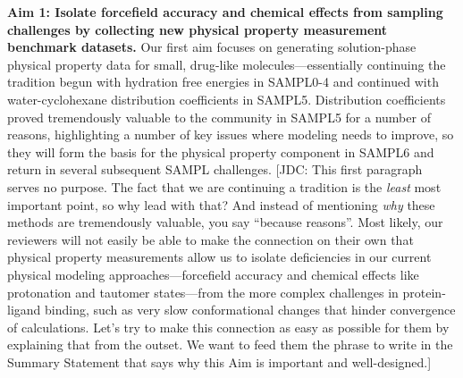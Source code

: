 \documentclass[11pt]{article}
\begin{document}
{\bf Aim 1: Isolate forcefield accuracy and chemical effects from sampling challenges by collecting new physical property measurement benchmark datasets.}
Our first aim focuses on generating solution-phase physical property data for small, drug-like molecules---essentially continuing the tradition begun with hydration free energies in SAMPL0-4 and continued with water-cyclohexane distribution coefficients in SAMPL5. 
Distribution coefficients proved tremendously valuable to the community in SAMPL5 for a number of reasons, highlighting a number of key issues where modeling needs to improve, so they will form the basis for the physical property component in SAMPL6 and return in several subsequent SAMPL challenges.
{\color{red}[JDC: This first paragraph serves no purpose. The fact that we are continuing a tradition is the \emph{least} most important point, so why lead with that? And instead of mentioning \emph{why} these methods are tremendously valuable, you say ``because reasons''. Most likely, our reviewers will not easily be able to make the connection on their own that physical property measurements allow us to isolate deficiencies in our current physical modeling approaches---forcefield accuracy and chemical effects like protonation and tautomer states---from the more complex challenges in protein-ligand binding, such as very slow conformational changes that hinder convergence of calculations. Let's try to make this connection as easy as possible for them by explaining that from the outset. We want to feed them the phrase to write in the Summary Statement that says why this Aim is important and well-designed.]}
\end{document}
